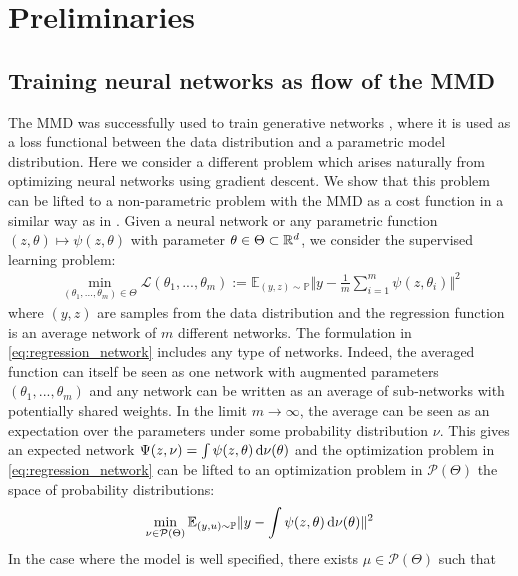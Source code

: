
\section{Preliminaries}\label{sec:preliminaries}


\subsection{Training neural networks as flow of the MMD}
The MMD was successfully used to train generative networks \cite{Arbel:2018,Binkowski:2018}, where it is used as a loss functional between the data distribution and a parametric model distribution.
Here we consider a different problem which arises naturally from optimizing neural networks using gradient descent. We show that this problem can be lifted to a non-parametric problem with the MMD as a cost function in a similar way as in \cite{Rotskoff:2019}. Given a neural network or any parametric function $(z,\theta)\mapsto \psi(z,\theta)$ with parameter $\theta \in \Theta \subset {{\mathbb R}}^d$, we consider the supervised learning problem:
\begin{align}\label{eq:regression_network}
	\min_{(\theta_1,...,\theta_m )\in \Theta} \mathcal{L}(\theta_1,...,\theta_m):= \mathbb{E}_{(y,z)\sim \mathbb{P}  }  \Vert y - \frac{1}{m}\sum_{i=1}^m\psi(z,\theta_i) \Vert^2
\end{align}
where $(y,z)$ are samples from the data distribution and the regression function is an average network of $m$ different networks. The formulation in \cref{eq:regression_network} includes any type of networks. Indeed, the averaged function can itself be seen as one network with augmented parameters $(\theta_1,...,\theta_m)$ and any network can be written as an average of sub-networks with potentially shared weights. In the limit $m\rightarrow \infty$, the average can be seen as an expectation over the parameters under some probability distribution $\nu$. This gives an expected network $\Psi(z,\nu) =  \int \psi(z,\theta) \mathop{}\!\mathrm{d} \nu(\theta) $ and the optimization problem in \cref{eq:regression_network} can be lifted to an optimization problem in $\mathcal{P}(\Theta)$ the space of probability distributions:
\begin{align}\label{eq:lifted_regression}
	\min_{\nu \in \mathcal{P}(\Theta)} \mathbb{E}_{(y,u)\sim \mathbb{P} }  \Vert y - \int \psi(z,\theta) \mathop{}\!\mathrm{d} \nu(\theta) \Vert^2
\end{align} 
In the case where the model is well specified, there exists $\mu \in \mathcal{P}(\Theta) $ such that 
